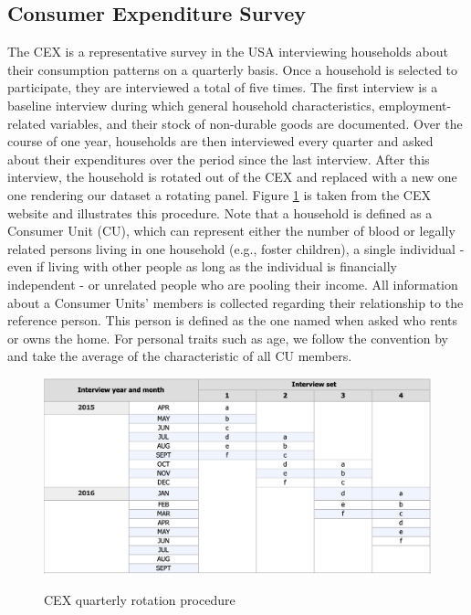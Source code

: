 \subsection{Consumer Expenditure Survey} 
The CEX is a representative survey in the USA interviewing households about their consumption patterns on a quarterly basis. Once a household is selected to participate, they are interviewed a total of five times. The first interview is a baseline interview during which general household characteristics, employment-related variables, and their stock of non-durable goods are documented. Over the course of one year, households are then interviewed every quarter and asked about their expenditures over the period since the last interview. After this interview, the household is rotated out of the CEX and replaced with a new one one rendering our dataset a rotating panel. Figure \ref{fig:cex_rotation} is taken from the CEX website and illustrates this procedure. Note that a household is defined as a Consumer Unit (CU), which can represent either the number of blood or legally related persons living in one household (e.g., foster children), a single individual - even if living with other people as long as the individual is financially independent - or unrelated people who are pooling their income. All information about a Consumer Units' members is collected regarding their relationship to the reference person. This person is defined as the one named when asked who rents or owns the home. For personal traits such as age, we follow the convention by \cite{parkeretal_2013} and take the average of the characteristic of all CU members.
\begin{figure}[t]
    \caption{CEX quarterly rotation procedure}
    \centering
    \includegraphics[width=.9\linewidth]{figures/CEX_rotation_table.png}
    \label{fig:cex_rotation}
\end{figure}

